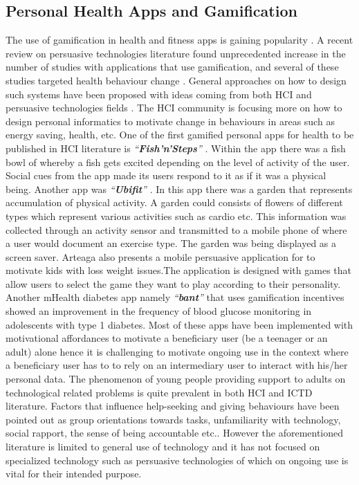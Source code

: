 \documentclass{sig-alternate}
\begin{document}
\subsection{Personal Health Apps and Gamification}  
The use of gamification in health and fitness apps is gaining popularity \cite{lister2014:just}. A recent review on persuasive technologies literature found unprecedented increase in the number of studies with applications that use gamification, and several of these studies targeted health behaviour change \cite{hamari2014persuasive}. General approaches on how to design such systems have been proposed with ideas coming from both HCI\cite{li2010:stage} and persuasive technologies fields \cite{fogg2009:behavior,Oinas-kukkonen:psd,Oinas-Kukkonen:foundation}.\newline 
The HCI community is focusing more on  how to design personal informatics to motivate change in behaviours in areas such as energy saving, health, etc. One of the first gamified personal apps for health to be published in HCI literature is \emph{``\textbf{Fish'n'Steps}''} \cite{lin2006:fish}. Within the app there  was a fish bowl of whereby a fish gets excited depending on the level of activity of the user. Social cues from the app made its users respond to it as if it was a physical being.\newline
Another app was \emph{``\textbf{Ubifit}''} \cite{klasnja2009:using}. In this app there was a garden that represents accumulation of physical activity. A garden could consists of flowers of different types which represent various activities such as cardio etc. This information was collected through an activity sensor and transmitted to a mobile phone of where a user would document an exercise type. The garden was being displayed as a screen saver.\newline
Arteaga \cite{arteaga2010:persuasive} also presents a mobile persuasive application for to motivate kids with loss weight issues.The application is designed with games that allow users to select the game they want to play according to their personality. Another mHealth diabetes app namely \emph{``\textbf{bant}''} that uses gamification incentives showed an improvement in the frequency of blood glucose monitoring in adolescents with type 1 diabetes.\newline
Most of these apps have been implemented with motivational affordances to motivate a beneficiary user (be a teenager or an adult) alone hence it is challenging to motivate ongoing use in the context where a beneficiary user has to to rely on an intermediary user to interact with his/her personal data. The phenomenon of young people providing support to adults on technological related problems is quite prevalent in both HCI and ICTD literature. Factors that influence help-seeking and giving behaviours have been pointed out as group orientations towards tasks, unfamiliarity with technology, social rapport, the sense of being accountable etc.\cite{sambasivan2010,poole:chh,kiesler:twi,parikh2006}. However the aforementioned literature is limited to general use of technology and it has not focused on specialized technology such as persuasive technologies of which on ongoing use is vital for their intended purpose.\newline
\end{document}
